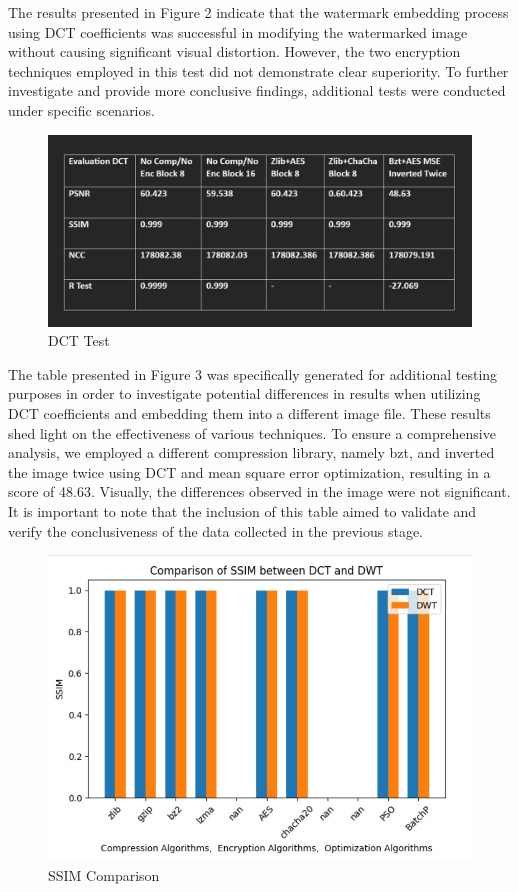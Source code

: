 \documentclass[conference]{IEEEtran}
\begin{document}
The results presented in Figure 2 indicate that the watermark embedding process using DCT coefficients was successful in modifying the watermarked image without causing significant visual distortion. However, the two encryption techniques employed in this test did not demonstrate clear superiority. To further investigate and provide more conclusive findings, additional tests were conducted under specific scenarios.


\begin{figure}[htbp]
\centering
\caption{DCT Test}
\label{fig}
\includegraphics[width=0.9\columnwidth]{TABLE.jpg}
\end{figure}

The table presented in Figure 3 was specifically generated for additional testing purposes in order to investigate potential differences in results when utilizing DCT coefficients and embedding them into a different image file. These results shed light on the effectiveness of various techniques. To ensure a comprehensive analysis, we employed a different compression library, namely bzt, and inverted the image twice using DCT and mean square error optimization, resulting in a score of 48.63. Visually, the differences observed in the image were not significant. It is important to note that the inclusion of this table aimed to validate and verify the conclusiveness of the data collected in the previous stage.

\begin{figure}[htbp]
\centering
\includegraphics[width=0.9\columnwidth]{SSIM.jpg}
\caption{SSIM Comparison}
\label{fig}
\end{figure}
\end{document}
